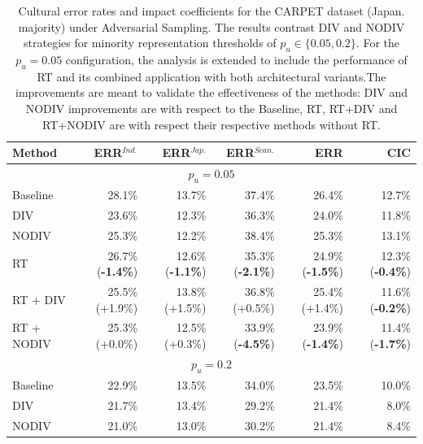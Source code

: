\begin{table}
\centering
\small
\begin{tabular}{lrrrrr}
\toprule
\textbf{Method} & \textbf{ERR$^{Ind.}$} & \textbf{ERR$^{Jap.}$} & \textbf{ERR$^{Scan.}$} & \textbf{ERR} & \textbf{CIC} \\
\midrule
\multicolumn{6}{c}{$p_u=0.05$} \\
\midrule
Baseline & 28.1\%&	13.7\%&	37.4\%&	26.4\%&	12.7\%\\	
DIV & 23.6\%&	12.3\%&	36.3\%&	24.0\%&	11.8\%\\	
NODIV & 25.3\%&	12.2\%&	38.4\%&	25.3\%&	13.1\%\\
\midrule
RT              & 26.7\% (\textbf{-1.4\%}) & 12.6\% (\textbf{-1.1\%}) & 35.3\% (\textbf{-2.1\%}) & 24.9\% (\textbf{-1.5\%}) & 12.3\% (\textbf{-0.4\%}) \\
RT + DIV        & 25.5\% (+1.9\%) & 13.8\% (+1.5\%) & 36.8\% (+0.5\%) & 25.4\% (+1.4\%) & 11.6\% (\textbf{-0.2\%}) \\
RT + NODIV      & 25.3\% (+0.0\%) & 12.5\% (+0.3\%) & 33.9\% (\textbf{-4.5\%}) & 23.9\% (\textbf{-1.4\%}) & 11.4\% (\textbf{-1.7\%}) \\
\midrule
\multicolumn{6}{c}{$p_u=0.2$} \\
\midrule
Baseline & 22.9\% & 13.5\% & 34.0\% & 23.5\% & 10.0\% \\
DIV  & 21.7\% & 13.4\% & 29.2\% & 21.4\% & 8.0\% \\
NODIV & 21.0\% & 13.0\% & 30.2\% & 21.4\% & 8.4\% \\
\bottomrule
\end{tabular}
\caption{Cultural error rates and impact coefficients for the CARPET dataset (Japan. majority) under Adversarial Sampling. The results contrast DIV and NODIV strategies for minority representation thresholds of $p_u \in \{0.05, 0.2\}$. For the $p_u = 0.05$ configuration, the analysis is extended to include the performance of RT and its combined application with both architectural variants.The improvements are meant to validate the effectiveness of the methods: DIV and NODIV improvements are with respect to the Baseline, RT, RT+DIV and RT+NODIV are with respect their respective methods without RT.}
\label{ch3:tab:ADVCJ}
\end{table}
%
%

